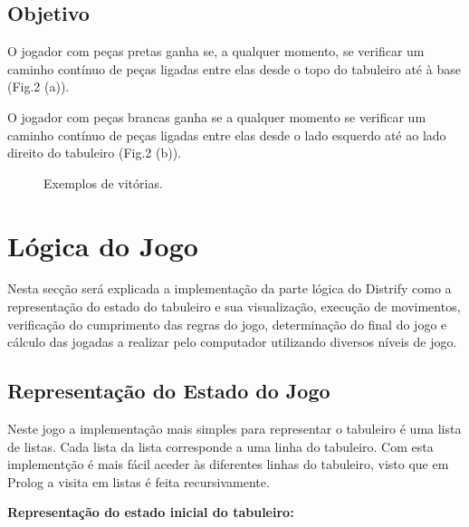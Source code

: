 \documentclass[a4paper]{article}
\begin{document}
\subsection*{Objetivo}

O jogador com peças pretas ganha se, a qualquer momento, se verificar um caminho contínuo de peças ligadas entre elas desde o topo do tabuleiro até à base (Fig.2 (a)).
\par
O jogador com peças brancas ganha se a qualquer momento se verificar um caminho contínuo de peças ligadas entre elas desde o lado esquerdo até ao lado direito do tabuleiro (Fig.2 (b)).

\begin{figure}[H]
	\centering
	\hfill
	\caption{Exemplos de vitórias.}
\end{figure}

\section{Lógica do Jogo}

Nesta secção será explicada a implementação da parte lógica do Distrify como a representação do estado do tabuleiro e sua visualização, execução de movimentos, verificação do cumprimento das regras do jogo, determinação do final do jogo e cálculo das jogadas a realizar pelo computador utilizando diversos níveis de jogo.

\subsection{Representação do Estado do Jogo}

Neste jogo a implementação mais simples para representar o tabuleiro é uma lista de listas. Cada lista da lista corresponde a uma linha do tabuleiro. Com esta implementção é mais fácil aceder às diferentes linhas do tabuleiro, visto que em Prolog a visita em listas é feita recursivamente.
\par
\textbf{Representação do estado inicial do tabuleiro:}

\end{document}
